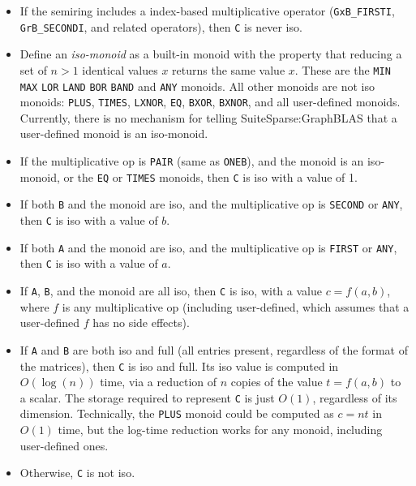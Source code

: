 \documentclass[12pt]{article}
\begin{document}
    \begin{itemize}
    \item If the semiring includes a index-based multiplicative operator
    (\verb'GxB_FIRSTI', \verb'GrB_SECONDI', and related operators), then
    \verb'C' is never iso.

    \item Define an {\em iso-monoid} as a built-in monoid with the property
    that reducing a set of $n>1$ identical values $x$ returns the same value
    $x$.  These are the \verb'MIN' \verb'MAX' \verb'LOR' \verb'LAND' \verb'BOR'
    \verb'BAND' and \verb'ANY' monoids.  All other monoids are not iso monoids:
    \verb'PLUS', \verb'TIMES', \verb'LXNOR', \verb'EQ', \verb'BXOR',
    \verb'BXNOR', and all user-defined monoids.   Currently, there is no
    mechanism for telling SuiteSparse:GraphBLAS that a user-defined monoid
    is an iso-monoid.

    \item If the multiplicative op is \verb'PAIR' (same as \verb'ONEB'),
    and the monoid is an
    iso-monoid, or the \verb'EQ' or \verb'TIMES' monoids, then \verb'C' is
    iso with a value of 1.

    \item If both \verb'B' and the monoid are iso, and the multiplicative op is
    \verb'SECOND' or \verb'ANY', then \verb'C' is iso with a value of $b$.

    \item If both \verb'A' and the monoid are iso, and the multiplicative op is
    \verb'FIRST' or \verb'ANY', then \verb'C' is iso with a value of $a$.

    \item If \verb'A', \verb'B', and the monoid are all iso, then \verb'C'
    is iso, with a value $c=f(a,b)$, where $f$ is any multiplicative op
    (including user-defined, which assumes that a user-defined $f$ has no
    side effects).

    \item If \verb'A' and \verb'B' are both iso and full (all entries present,
    regardless of the format of the matrices), then \verb'C' is iso and full.
    Its iso value is computed in $O(\log(n))$ time, via a reduction of $n$
    copies of the value $t=f(a,b)$ to a scalar.  The storage required to
    represent \verb'C' is just $O(1)$, regardless of its dimension.
    Technically, the \verb'PLUS' monoid could be computed as $c=nt$ in $O(1)$
    time, but the log-time reduction works for any monoid, including
    user-defined ones.

    \item Otherwise, \verb'C' is not iso.
    \end{itemize}
\end{document}
